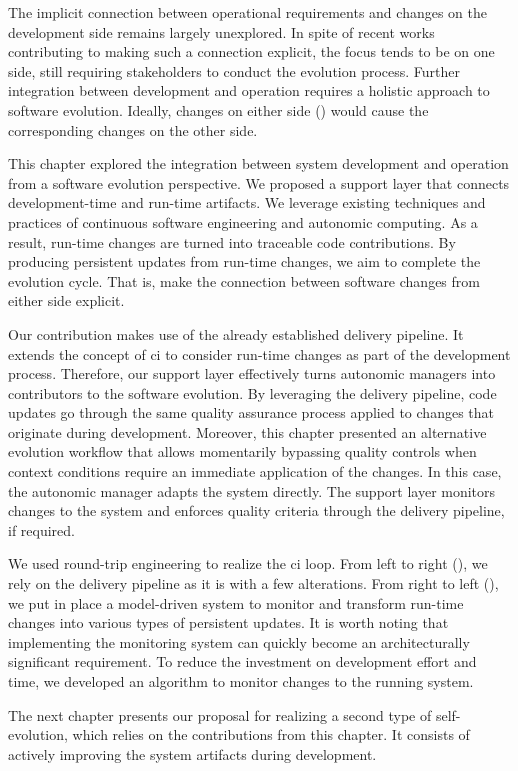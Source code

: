 The implicit connection between operational requirements and changes on the development side remains largely unexplored. In spite of recent works contributing to making such a connection explicit, the focus tends to be on one side, still requiring stakeholders to conduct the evolution process. Further integration between development and operation requires a holistic approach to software evolution. Ideally, changes on either side () would cause the corresponding changes on the other side.

This chapter explored the integration between system development and operation from a software evolution perspective. We proposed a support layer that connects development-time and run-time artifacts. We leverage existing techniques and practices of continuous software engineering and autonomic computing. As a result, run-time changes are turned into traceable code contributions. By producing persistent updates from run-time changes, we aim to complete the evolution cycle. That is, make the connection between software changes from either side explicit.

Our contribution makes use of the already established delivery pipeline. It extends the concept of \gls{ci} to consider run-time changes as part of the development process. Therefore, our support layer effectively turns autonomic managers into contributors to the software evolution. By leveraging the delivery pipeline, code updates go through the same quality assurance process applied to changes that originate during development. Moreover, this chapter presented an alternative evolution workflow that allows momentarily bypassing quality controls when context conditions require an immediate application of the changes. In this case, the autonomic manager adapts the system directly. The support layer monitors changes to the system and enforces quality criteria through the delivery pipeline, if required.

We used round-trip engineering to realize the \gls{ci} loop. From left to right (), we rely on the delivery pipeline as it is with a few alterations. From right to left (), we put in place a model-driven system to monitor and transform run-time changes into various types of persistent updates. It is worth noting that implementing the monitoring system can quickly become an architecturally significant requirement. To reduce the investment on development effort and time, we developed an algorithm to monitor changes to the running system.

The next chapter presents our proposal for realizing a second type of self-evolution, which relies on the contributions from this chapter. It consists of actively improving the system artifacts during development.
